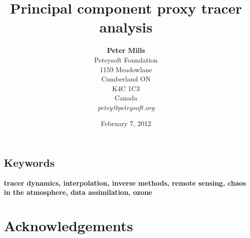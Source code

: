 \documentclass[12pt]{article}
\begin{document}
\title{Principal component proxy tracer analysis}

\author{\textbf{Peter Mills}\\
Peteysoft Foundation\\
1159 Meadowlane\\Cumberland ON\\ K4C 1C3\\ Canada\\\textit{petey@peteysoft.org}}
\date{February 7, 2012}

\maketitle



\vspace{0.5cm}


\begin{abstract}

\end{abstract}

\subsection*{Keywords}
\textbf{tracer dynamics,
interpolation,
inverse methods,
remote sensing,
chaos in the atmosphere,
data assimilation,
ozone}






\section*{Acknowledgements}




\end{document}
